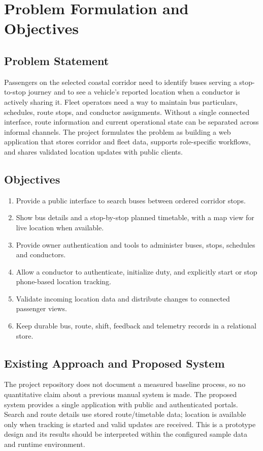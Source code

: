 \documentclass[12pt,a4paper]{report}
\begin{document}
\chapter{Problem Formulation and Objectives}
\section{Problem Statement}
Passengers on the selected coastal corridor need to identify buses serving a stop-to-stop journey and to see a vehicle's reported location when a conductor is actively sharing it. Fleet operators need a way to maintain bus particulars, schedules, route stops, and conductor assignments. Without a single connected interface, route information and current operational state can be separated across informal channels. The project formulates the problem as building a web application that stores corridor and fleet data, supports role-specific workflows, and shares validated location updates with public clients.

\section{Objectives}
\begin{enumerate}
\item Provide a public interface to search buses between ordered corridor stops.
\item Show bus details and a stop-by-stop planned timetable, with a map view for live location when available.
\item Provide owner authentication and tools to administer buses, stops, schedules and conductors.
\item Allow a conductor to authenticate, initialize duty, and explicitly start or stop phone-based location tracking.
\item Validate incoming location data and distribute changes to connected passenger views.
\item Keep durable bus, route, shift, feedback and telemetry records in a relational store.
\end{enumerate}

\section{Existing Approach and Proposed System}
The project repository does not document a measured baseline process, so no quantitative claim about a previous manual system is made. The proposed system provides a single application with public and authenticated portals. Search and route details use stored route/timetable data; location is available only when tracking is started and valid updates are received. This is a prototype design and its results should be interpreted within the configured sample data and runtime environment.
\end{document}

